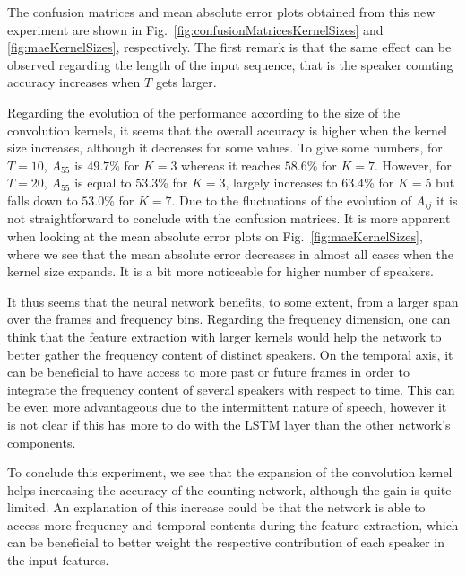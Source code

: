 The confusion matrices and mean absolute error plots obtained from this new experiment are shown in Fig.~\ref{fig:confusionMatricesKernelSizes} and \ref{fig:maeKernelSizes}, respectively. The first remark is that the same effect can be observed regarding the length of the input sequence, that is the speaker counting accuracy increases when $T$ gets larger.

Regarding the evolution of the performance according to the size of the convolution kernels, it seems that the overall accuracy is higher when the kernel size increases, although it decreases for some values. To give some numbers, for $T=10$, $A_{55}$ is $49.7$\% for $K=3$ whereas it reaches $58.6$\% for $K=7$. However, for $T=20$, $A_{55}$ is equal to $53.3$\% for $K=3$, largely increases to $63.4$\% for $K=5$ but falls down to $53.0$\% for $K=7$. Due to the fluctuations of the evolution of $A_{ij}$ it is not straightforward to conclude with the confusion matrices. It is more apparent when looking at the mean absolute error plots on Fig.~\ref{fig:maeKernelSizes}, where we see that the mean absolute error decreases in almost all cases when the kernel size expands. It is a bit more noticeable for higher number of speakers.

It thus seems that the neural network benefits, to some extent, from a larger span over the frames and frequency bins. Regarding the frequency dimension, one can think that the feature extraction with larger kernels would help the network to better gather the frequency content of distinct speakers. On the temporal axis, it can be beneficial to have access to more past or future frames in order to integrate the frequency content of several speakers with respect to time. This can be even more advantageous due to the intermittent nature of speech, however it is not clear if this has more to do with the LSTM layer than the other network's components. 

To conclude this experiment, we see that the expansion of the convolution kernel helps increasing the accuracy of the counting network, although the gain is quite limited. An explanation of this increase could be that the network is able to access more frequency and temporal contents during the feature extraction, which can be beneficial to better weight the respective contribution of each speaker in the input features.

